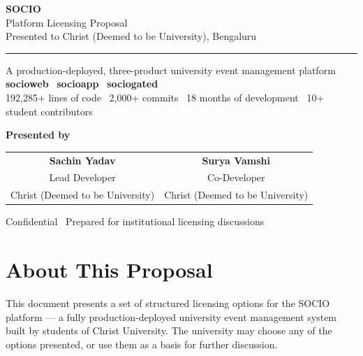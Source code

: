 \documentclass[12pt,a4paper]{article}
\begin{document}
\begin{titlepage}
\centering
\vspace*{2cm}

{\fontsize{40}{50}\selectfont\bfseries\color{primary} SOCIO}\\[0.4cm]
{\Large\color{accent} Platform Licensing Proposal}\\[0.3cm]
{\normalsize\color{darkgray} Presented to Christ (Deemed to be University), Bengaluru}

\vspace{1.2cm}
\noindent\rule{\textwidth}{1.5pt}
\vspace{0.5cm}

\begin{highlightbox}
\centering
A production-deployed, three-product university event management platform\\[0.3cm]
\textbf{socioweb} \textbullet\ \textbf{socioapp} \textbullet\ \textbf{sociogated}\\[0.3cm]
{\small 192,285+ lines of code \textbullet\ 2,000+ commits \textbullet\ 18 months of development \textbullet\ 10+ student contributors}
\end{highlightbox}

\vspace{1.5cm}

{\normalsize
\textbf{Presented by}\\[0.4cm]
\begin{tabular}{cc}
\textbf{Sachin Yadav} & \textbf{Surya Vamshi} \\
Lead Developer & Co-Developer \\
{\small Christ (Deemed to be University)} & {\small Christ (Deemed to be University)}
\end{tabular}
}

\vfill
{\small\color{darkgray} Confidential \textbullet\ Prepared for institutional licensing discussions \textbullet\ \the\year}
\end{titlepage}

\newpage
\tableofcontents
\newpage

\section{About This Proposal}

This document presents a set of structured licensing options for the SOCIO platform — a fully production-deployed university event management system built by students of Christ University. The university may choose any of the options presented, or use them as a basis for further discussion.
\end{document}
